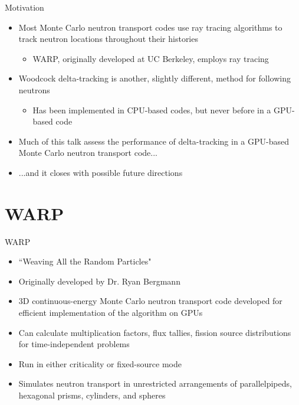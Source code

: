 \documentclass[xcolor=x11names, compress]{beamer}
\renewcommand{\(}{\begin{columns}}
\renewcommand{\)}{\end{columns}}
\newcommand{\<}[1]{\begin{column}{#1}}
\renewcommand{\>}{\end{column}}
\begin{document}
\begin{frame}{Motivation}
	\begin{itemize}
	\item{Most Monte Carlo neutron transport codes use ray tracing algorithms to track neutron 
	locations throughout their histories}
		\begin{itemize}
		\item{WARP, originally developed at UC Berkeley, employs ray tracing \cite{warp}}
		\end{itemize}
	\pause
	\item{Woodcock delta-tracking is another, slightly different, method for following neutrons 
	\cite{serpent}}
		\begin{itemize}
		\item{Has been implemented in CPU-based codes, but never before in a GPU-based code}
		\end{itemize}
	\pause
	\item{Much of this talk assess the performance of delta-tracking in a
	GPU-based Monte Carlo neutron transport code...}
	\pause
	\item{...and it closes with possible future directions}
	\end{itemize}
\end{frame}


\section{\scshape WARP}
\begin{frame}{WARP \cite{warp}}
	\begin{itemize}
	\item{``Weaving All the Random Particles"}
	\item{Originally developed by Dr. Ryan Bergmann}
	\item{3D continuous-energy Monte Carlo neutron transport code developed for efficient 
	implementation of the algorithm on GPUs}
	\vspace*{1 em}
	\item{Can calculate multiplication factors, flux tallies, fission source distributions for 
	time-independent problems}
	\item{Run in either criticality or fixed-source mode}
	\item{Simulates neutron transport in unrestricted arrangements of parallelpipeds, hexagonal 
	prisms, cylinders, and spheres}
	\end{itemize}
\end{frame}
\end{document}
